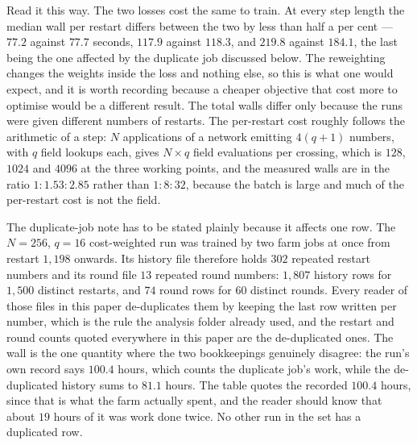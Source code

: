 \documentclass[11pt,a4paper]{article}
\begin{document}
Read it this way. The two losses cost the same to train. At every step length
the median wall per restart differs between the two by less than half a per
cent --- $77.2$ against $77.7$ seconds, $117.9$ against $118.3$, and $219.8$
against $184.1$, the last being the one affected by the duplicate job discussed
below. The reweighting changes the weights inside the loss and nothing else, so
this is what one would expect, and it is worth recording because a cheaper
objective that cost more to optimise would be a different result. The total
walls differ only because the runs were given different numbers of restarts.
The per-restart cost roughly follows the arithmetic of a step: $N$ applications
of a network emitting $4(q+1)$ numbers, with $q$ field lookups each, gives
$N \times q$ field evaluations per crossing, which is $128$, $1024$ and $4096$
at the three working points, and the measured walls are in the ratio
$1 : 1.53 : 2.85$ rather than $1 : 8 : 32$, because the batch is large and much
of the per-restart cost is not the field.

The duplicate-job note has to be stated plainly because it affects one row.
The $N = 256$, $q = 16$ cost-weighted run was trained by two farm jobs at once
from restart $1{,}198$ onwards. Its history file therefore holds $302$ repeated
restart numbers and its round file $13$ repeated round numbers: $1{,}807$
history rows for $1{,}500$ distinct restarts, and $74$ round rows for $60$
distinct rounds. Every reader of those files in this paper de-duplicates them by
keeping the last row written per number, which is the rule the analysis folder
already used, and the restart and round counts quoted everywhere in this paper
are the de-duplicated ones. The wall is the one quantity where the two
bookkeepings genuinely disagree: the run's own record says $100.4$ hours, which
counts the duplicate job's work, while the de-duplicated history sums to
$81.1$ hours. The table quotes the recorded $100.4$ hours, since that is what
the farm actually spent, and the reader should know that about $19$ hours of it
was work done twice. No other run in the set has a duplicated row.
\end{document}
